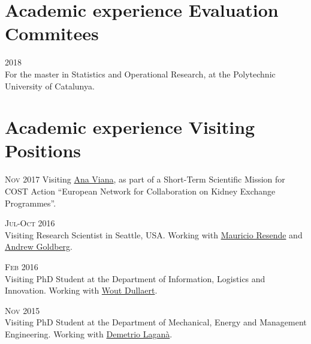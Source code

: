 \section*{Academic experience {\small Evaluation Commitees}}

\begin{paracol}{2}
  \textsc{2018}
\switchcolumn
  \\
  For the master in Statistics and Operational Research, at the Polytechnic University of Catalunya.
\end{paracol}

\section*{Academic experience {\small Visiting Positions}}

\begin{paracol}{2}
  \textsc{Nov 2017}
\switchcolumn
  Visiting \href{https://scholar.google.com/citations?user=RW7QevYAAAAJ}{Ana Viana}, as part of a Short-Term Scientific Mission for COST Action ``European Network for Collaboration on Kidney Exchange Programmes''.
\end{paracol}

\begin{paracol}{2}
  \textsc{Jul-Oct 2016}
\switchcolumn
  \\
  Visiting Research Scientist in Seattle, USA. Working with \href{https://scholar.google.com/citations?user=KTmPx50AAAAJ}{Mauricio Resende} and \href{https://scholar.google.it/citations?user=U5iFVowAAAAJ}{Andrew Goldberg}.
\end{paracol}

\begin{paracol}{2}
  \textsc{Feb 2016}
\switchcolumn
  \\
  Visiting PhD Student at the Department of Information, Logistics and Innovation. Working with \href{https://scholar.google.com/citations?user=wjjCd5UAAAAJ}{Wout Dullaert}.
\end{paracol}

\begin{paracol}{2}
  \textsc{Nov 2015}
\switchcolumn
  \\
  Visiting PhD Student at the Department of Mechanical, Energy and Management Engineering. Working with \href{https://scholar.google.com/citations?user=r_qFOqgAAAAJ}{Demetrio Laganà}.
\end{paracol}


